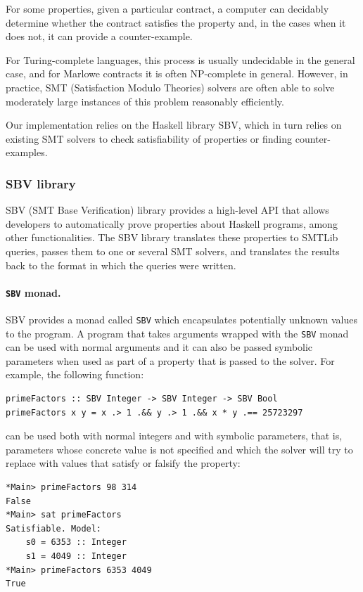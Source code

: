 \documentclass[runningheads]{llncs}
\begin{document}
For some properties, given a particular contract, a computer can decidably determine whether the contract satisfies the property and, in the cases when it does not, it can provide a counter-example.

For Turing-complete languages, this process is usually undecidable in the general case, and for Marlowe contracts it is often NP-complete in general. However, in practice, SMT (Satisfaction Modulo Theories) solvers are often able to solve moderately large instances of this problem reasonably efficiently.

Our implementation relies on the Haskell library SBV, which in turn relies on existing SMT solvers to check satisfiability of properties or finding counter-examples.

\subsubsection{SBV library}

SBV \cite{SBV} (SMT Base Verification) library provides a high-level API that allows developers to automatically prove properties about Haskell programs, among other functionalities.
The SBV library translates these properties to SMTLib queries, passes them to one or several SMT solvers, and translates the results back to the format in which the queries were written.

\paragraph{\texttt{SBV} monad.}

SBV provides a monad called \texttt{SBV} which encapsulates potentially unknown values to the program. A program that takes arguments wrapped with the \texttt{SBV} monad can be used with normal arguments and it can also be passed symbolic parameters when used as part of a property that is passed to the solver.
For example, the following function:

\begin{verbatim}
primeFactors :: SBV Integer -> SBV Integer -> SBV Bool
primeFactors x y = x .> 1 .&& y .> 1 .&& x * y .== 25723297
\end{verbatim}

\noindent
can be used both with normal integers and with symbolic parameters, that is, parameters whose concrete value is not specified and which the solver will try to replace with values that satisfy or falsify the property:

\begin{verbatim}
*Main> primeFactors 98 314
False
*Main> sat primeFactors
Satisfiable. Model:
    s0 = 6353 :: Integer
    s1 = 4049 :: Integer
*Main> primeFactors 6353 4049
True
\end{verbatim}
\end{document}
